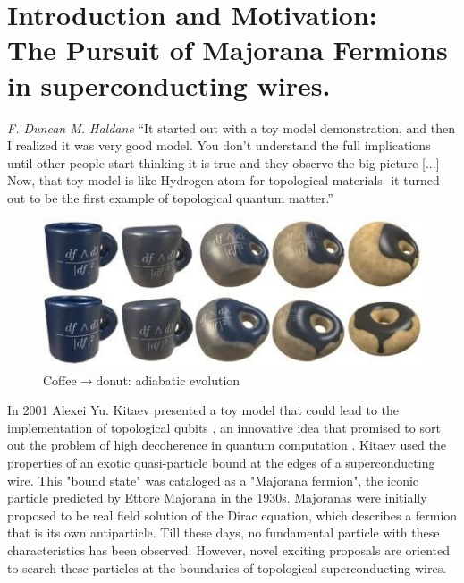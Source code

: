 \chapter{Introduction and Motivation: \\ The Pursuit of Majorana Fermions in superconducting wires. \label{chap:Motivation} }


\begin{chapquote}{\textit{F. Duncan M. Haldane}}
``It started out with a toy model demonstration, and then I realized it was very good model.  You don't understand the full implications until other people start thinking it is true and they observe the big picture [...] Now, that toy model is like Hydrogen atom for topological materials- it turned out to be the first example of topological quantum matter.''
\end{chapquote}
\begin{figure}[b]
  \centering
  \includegraphics[scale = 0.5]{IMAGES/Majorana/Coffe&donuts.jpg}
  \caption{Coffee$\rightarrow$donut: adiabatic evolution \label{fig:Coffe}}
\end{figure}


In 2001 Alexei Yu. Kitaev presented a toy model that could lead to the implementation of topological qubits \citep{kitaev_unpaired_2001}, an innovative idea that promised to sort out the problem of high decoherence in quantum computation . Kitaev used the properties of an exotic quasi-particle bound at the edges of a superconducting wire. This "bound state" was cataloged as a "Majorana fermion", the iconic particle predicted by Ettore Majorana in the 1930s. Majoranas were initially proposed to be real field solution of the Dirac equation, which describes a fermion that is its own antiparticle\citep{wilczek_majorana_2009}.  Till these days, no fundamental particle with these characteristics has been observed. However, novel exciting  proposals are oriented to search these particles at the boundaries of topological superconducting wires. 



